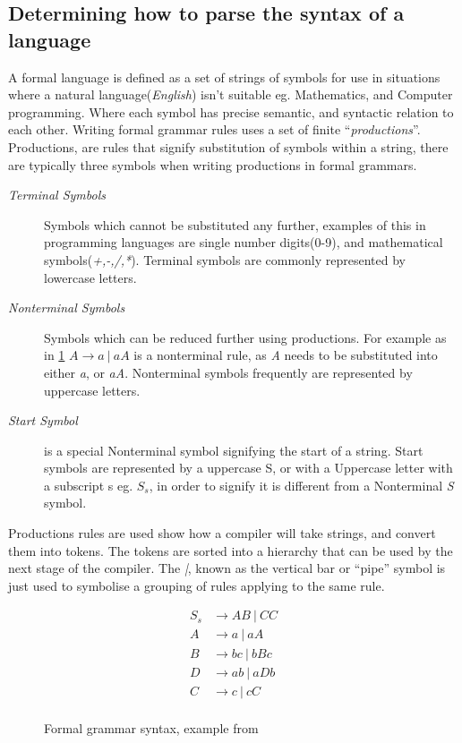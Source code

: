 \subsection{Determining how to parse the syntax of a language}
A formal language is defined as a set of strings of symbols for use in situations where a natural language(\emph{English}) isn't suitable eg. Mathematics, and Computer programming. Where each symbol has precise semantic, and syntactic relation to each other. Writing formal grammar rules uses a set of finite ``\emph{productions}''. Productions, are rules that signify substitution of symbols within a string, there are typically three symbols when writing productions in formal grammars.
\begin{description}
    \item[\emph{Terminal Symbols}] Symbols which cannot be substituted any further, examples of this in programming languages are single number digits(0-9), and mathematical symbols(\emph{+,-,/,*}). Terminal symbols are commonly represented by lowercase letters.
    
    \item[\emph{Nonterminal Symbols}] Symbols which can be reduced further using productions. For example as in \ref{fig:formalGrammar} $A \rightarrow a\ |\ aA$ is a nonterminal rule, as \emph{A} needs to be substituted into either \emph{a}, or \emph{aA}. Nonterminal symbols frequently are represented by uppercase letters.

    \item[\emph{Start Symbol}] is a special Nonterminal symbol signifying the start of a string. Start symbols are represented by a uppercase S, or with a Uppercase letter with a subscript s eg. $S_s$, in order to signify it is different from a Nonterminal \emph{S} symbol.
\end{description}
\newpage
Productions rules are used show how a compiler will take strings, and convert them into tokens. The tokens are sorted into a hierarchy that can be used by the next stage of the compiler. The \emph{|}, known as the vertical bar or ``pipe'' symbol is just used to symbolise a grouping of rules applying to the same rule.
\begin{figure}[ht!]
    \begin{align*}
    S_s &\rightarrow AB\ |\ CC \\
    A &\rightarrow a\ |\ aA \\
    B &\rightarrow bc\ |\ bBc \\
    D &\rightarrow ab\ |\ aDb \\
    C &\rightarrow c\ |\ cC \\
    \end{align*}
    \caption{Formal grammar syntax, example from \cite{ParseTech}}
    \label{fig:formalGrammar}
\end{figure}
\newpage
